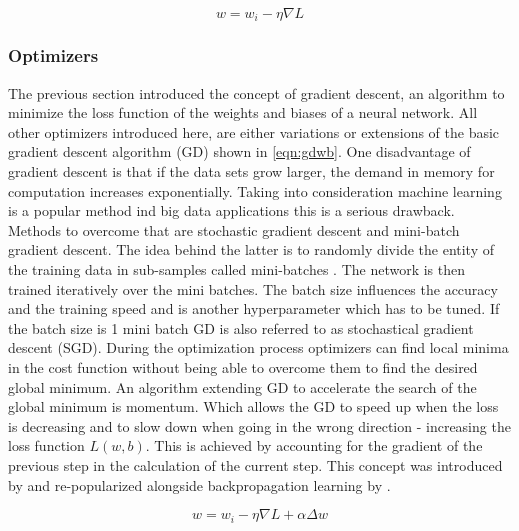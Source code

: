\begin{equation}
  w = w_i - \eta  \nabla L
  \label{eqn:simplegd}  
\end{equation}

\subsubsection{Optimizers}
The previous section introduced the concept of gradient descent, an algorithm to minimize the loss function of
the weights and biases of a neural network. All other optimizers introduced here, are either variations or
extensions of the basic gradient descent algorithm (GD) shown in \ref{eqn:gdwb}. One disadvantage of gradient
descent is that if the data sets grow larger, the demand in memory for computation increases
exponentially. Taking into consideration machine learning is a popular method ind big data applications this
is a serious drawback. Methods to overcome that are stochastic gradient descent and mini-batch gradient
descent.  The idea behind the latter is to randomly divide the entity of the training data in sub-samples
called mini-batches \cite{bottou-bousquet-2008}. The network is then trained iteratively over the mini
batches. The batch size influences the accuracy and the training speed and is another hyperparameter which has
to be tuned. If the batch size is 1 mini batch GD is also referred to as stochastical gradient descent (SGD).
During the optimization process optimizers can find local minima in the cost function without being able to
overcome them to find the desired global minimum. An algorithm extending GD to accelerate the search of the
global minimum is momentum. Which allows the GD to speed up when the loss is decreasing and to slow down when
going in the wrong direction - increasing the loss function $L(w,b)$. This is achieved by accounting for the
gradient of the previous step in the calculation of the current step. This concept was introduced by
\cite{polyak1964} and re-popularized alongside backpropagation learning by \cite{rumelhart1988learning}.

\begin{equation}
  w = w_i - \eta \nabla L + \alpha \Delta w
  \label{eqn:momentum}
\end{equation}

